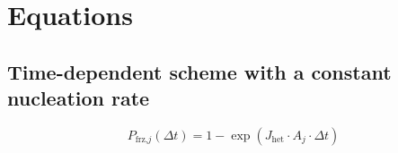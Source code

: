 \documentclass{article}
\begin{document}
\begin{comment}
\( J_{\text{het}}^{(i)} \) & Heterogeneous freezing rate coefficients of the \( i \)th species. \\
        \( A_i \) & Surface area of \( i \)th species. \\
        \( A \) & The total surface area of the INP. \\
        \( \Delta t \) & Time interval. \\
        \( a_{\text{w}} \) & Water activity of the droplet in which the INP is immersed. \\
        \( a_\text{w}^\text{ice} \) & Water activity in equilibrium with ice. \\
        \( RH \) & Relative humidity with respect to water. \\
        \( e_\text{s} \) & Saturated vapor pressure with respect to water. \\
        \( e_\text{s}^\text{ice} \) & Saturated vapor pressure with respect to ice. \\
        \( m_i, c_i \) & ABIFM parameters of \( i^\text{th} \) species. \\
        \( N_\text{s} \) & The total number of species covering the surface of the INP. \\
        \hline
\end{comment}

\section{Equations}
\label{sec:equations}

\subsection{Time-dependent scheme with a constant nucleation rate}
\begin{equation}
    P_{\text{frz,}j}(\Delta t) = 1 - \exp\left(J_{\text{het}} \cdot A_j \cdot \Delta t \right) \label{eq:1}
\end{equation}
\end{document}
